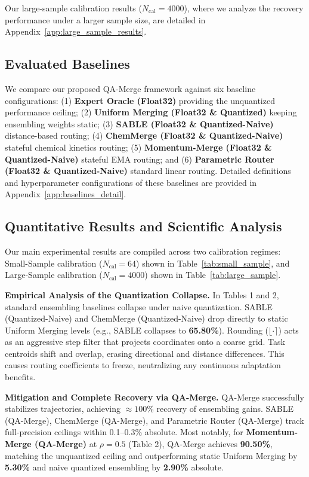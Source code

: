 Our large-sample calibration results ($N_{\text{cal}}=4000$), where we analyze the recovery performance under a larger sample size, are detailed in Appendix~\ref{app:large_sample_results}.


\subsection{Evaluated Baselines}
We compare our proposed QA-Merge framework against six baseline configurations: (1) \textbf{Expert Oracle (Float32)} providing the unquantized performance ceiling; (2) \textbf{Uniform Merging (Float32 \& Quantized)} keeping ensembling weights static; (3) \textbf{SABLE (Float32 \& Quantized-Naive)} distance-based routing; (4) \textbf{ChemMerge (Float32 \& Quantized-Naive)} stateful chemical kinetics routing; (5) \textbf{Momentum-Merge (Float32 \& Quantized-Naive)} stateful EMA routing; and (6) \textbf{Parametric Router (Float32 \& Quantized-Naive)} standard linear routing. Detailed definitions and hyperparameter configurations of these baselines are provided in Appendix~\ref{app:baselines_detail}.

\subsection{Quantitative Results and Scientific Analysis}
Our main experimental results are compiled across two calibration regimes: Small-Sample calibration ($N_{\text{cal}} = 64$) shown in Table~\ref{tab:small_sample}, and Large-Sample calibration ($N_{\text{cal}} = 4000$) shown in Table~\ref{tab:large_sample}.

\textbf{Empirical Analysis of the Quantization Collapse.} In Tables 1 and 2, standard ensembling baselines collapse under naive quantization. SABLE (Quantized-Naive) and ChemMerge (Quantized-Naive) drop directly to static Uniform Merging levels (e.g., SABLE collapses to \textbf{65.80\%}). Rounding ($\lfloor \cdot \rceil$) acts as an aggressive step filter that projects coordinates onto a coarse grid. Task centroids shift and overlap, erasing directional and distance differences. This causes routing coefficients to freeze, neutralizing any continuous adaptation benefits.

\textbf{Mitigation and Complete Recovery via QA-Merge.} QA-Merge successfully stabilizes trajectories, achieving $\approx 100\%$ recovery of ensembling gains. SABLE (QA-Merge), ChemMerge (QA-Merge), and Parametric Router (QA-Merge) track full-precision ceilings within 0.1--0.3\% absolute. Most notably, for \textbf{Momentum-Merge (QA-Merge)} at $\rho=0.5$ (Table 2), QA-Merge achieves \textbf{90.50\%}, matching the unquantized ceiling and outperforming static Uniform Merging by \textbf{5.30\%} and naive quantized ensembling by \textbf{2.90\%} absolute.

